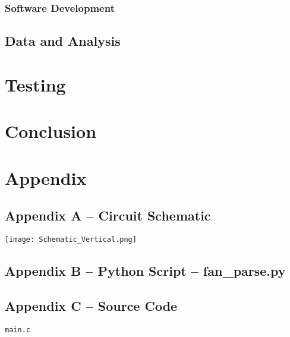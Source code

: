 \documentclass[11pt]{article}
\begin{document}
\subsubsection{Software Development}

\subsection{Data and Analysis}

\section{Testing}

\section{Conclusion}

\pagebreak
\section*{Appendix}
\subsection*{Appendix A -- Circuit Schematic}
\begin{center} \texttt{[image: Schematic\_Vertical.png]}\end{center}
\pagebreak


\subsection*{Appendix B -- Python Script -- fan\_parse.py}

\pagebreak


\subsection*{Appendix C -- Source Code}
\begin{LARGE}\noindent\texttt{main.c}\end{LARGE}

\end{document}
